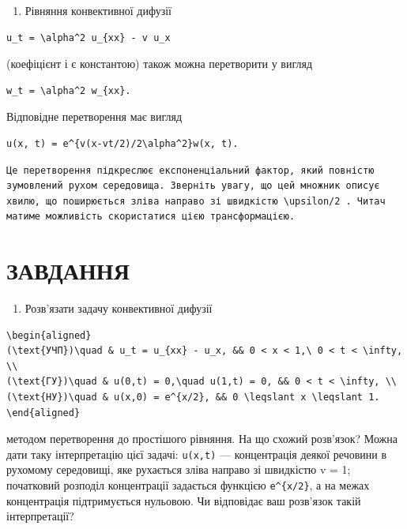 \documentclass[
  ukrainian,
]{article}
\providecommand{\tightlist}{%
  \setlength{\itemsep}{0pt}\setlength{\parskip}{0pt}}
\begin{document}
\begin{enumerate}
\def\labelenumi{\arabic{enumi}.}
\setcounter{enumi}{1}
\tightlist
\item
  Рівняння конвективної дифузії
\end{enumerate}

\begin{verbatim}
u_t = \alpha^2 u_{xx} - v u_x
\end{verbatim}

(коефіцієнт і є константою) також можна перетворити у вигляд

\begin{verbatim}
w_t = \alpha^2 w_{xx}.
\end{verbatim}

Відповідне перетворення має вигляд

\begin{verbatim}
u(x, t) = e^{v(x-vt/2)/2\alpha^2}w(x, t).
\end{verbatim}

\begin{verbatim}
Це перетворення підкреслює експоненціальний фактор, який повністю зумовлений рухом середовища. Зверніть увагу, що цей множник описує хвилю, що поширюється зліва направо зі швидкістю \upsilon/2 . Читач матиме можливість скористатися цією трансформацією.
\end{verbatim}

\section{ЗАВДАННЯ}\label{ux437ux430ux432ux434ux430ux43dux43dux44f-4}

\begin{enumerate}
\def\labelenumi{\arabic{enumi}.}
\tightlist
\item
  Розв'язати задачу конвективної дифузії
\end{enumerate}

\begin{verbatim}
\begin{aligned}
(\text{УЧП})\quad & u_t = u_{xx} - u_x, && 0 < x < 1,\ 0 < t < \infty, \\
(\text{ГУ})\quad & u(0,t) = 0,\quad u(1,t) = 0, && 0 < t < \infty, \\
(\text{НУ})\quad & u(x,0) = e^{x/2}, && 0 \leqslant x \leqslant 1.
\end{aligned}
\end{verbatim}

методом перетворення до простішого рівняння. На що схожий розв'язок?
Можна дати таку інтерпретацію цієї задачі: \texttt{u(x,t)} ---
концентрація деякої речовини в рухомому середовищі, яке рухається зліва
направо зі швидкістю v = 1; початковий розподіл концентрації задається
функцією \texttt{e\^{}\{x/2\}}, а на межах концентрація підтримується
нульовою. Чи відповідає ваш розв'язок такій інтерпретації?
\end{document}
